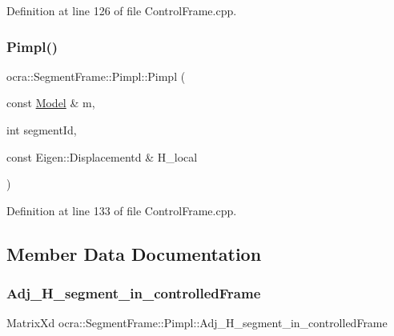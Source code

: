 Definition at line 126 of file Control\+Frame.\+cpp.

\hypertarget{structocra_1_1SegmentFrame_1_1Pimpl_a6bc146a3436c88655f79afd8bf7a46b3}{}\label{structocra_1_1SegmentFrame_1_1Pimpl_a6bc146a3436c88655f79afd8bf7a46b3} 
\subsubsection{\texorpdfstring{Pimpl()}{Pimpl()}\hspace{0.1cm}{\footnotesize\ttfamily [4/4]}}
{\footnotesize\ttfamily ocra\+::\+Segment\+Frame\+::\+Pimpl\+::\+Pimpl (\begin{DoxyParamCaption}\item[{const \hyperlink{classocra_1_1Model}{Model} \&}]{m,  }\item[{int}]{segment\+Id,  }\item[{const Eigen\+::\+Displacementd \&}]{H\+\_\+local }\end{DoxyParamCaption})\hspace{0.3cm}{\ttfamily [inline]}}



Definition at line 133 of file Control\+Frame.\+cpp.



\subsection{Member Data Documentation}
\hypertarget{structocra_1_1SegmentFrame_1_1Pimpl_a3b188df19a7b138373a1861dfa5aad1d}{}\label{structocra_1_1SegmentFrame_1_1Pimpl_a3b188df19a7b138373a1861dfa5aad1d} 
\subsubsection{\texorpdfstring{Adj\+\_\+\+H\+\_\+segment\+\_\+in\+\_\+controlled\+Frame}{Adj\_H\_segment\_in\_controlledFrame}}
{\footnotesize\ttfamily Matrix\+Xd ocra\+::\+Segment\+Frame\+::\+Pimpl\+::\+Adj\+\_\+\+H\+\_\+segment\+\_\+in\+\_\+controlled\+Frame}



